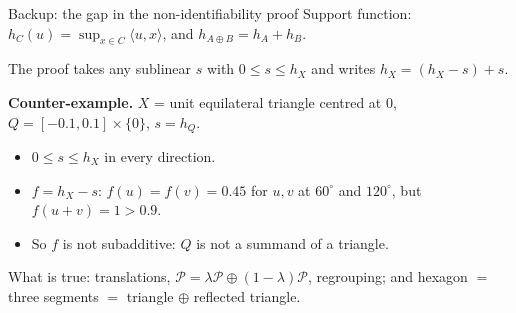 \documentclass[aspectratio=169,10pt]{beamer}
\newcommand{\msum}{\oplus}
\newcommand{\cP}{\mathcal{P}}
\begin{document}
\begin{frame}{Backup: the gap in the non-identifiability proof}
  Support function: $h_C(u)=\sup_{x\in C}\langle u,x\rangle$, and $h_{A\msum B}=h_A+h_B$.\par\medskip
  The proof takes any sublinear $s$ with $0\le s\le h_X$ and writes $h_X=(h_X-s)+s$.\par\medskip
  \textbf{Counter-example.} $X$ = unit equilateral triangle centred at $0$, $Q=[-0.1,0.1]\times\{0\}$, $s=h_Q$.
  \begin{itemize}
    \item $0\le s\le h_X$ in every direction.
    \item $f=h_X-s$: $f(u)=f(v)=0.45$ for $u,v$ at $60^\circ$ and $120^\circ$, but $f(u+v)=1>0.9$.
    \item So $f$ is not subadditive: $Q$ is not a summand of a triangle.
  \end{itemize}
  \medskip
  What is true: translations, $\cP=\lambda\cP\msum(1-\lambda)\cP$, regrouping; and
  hexagon $=$ three segments $=$ triangle $\msum$ reflected triangle.
\end{frame}
\end{document}
